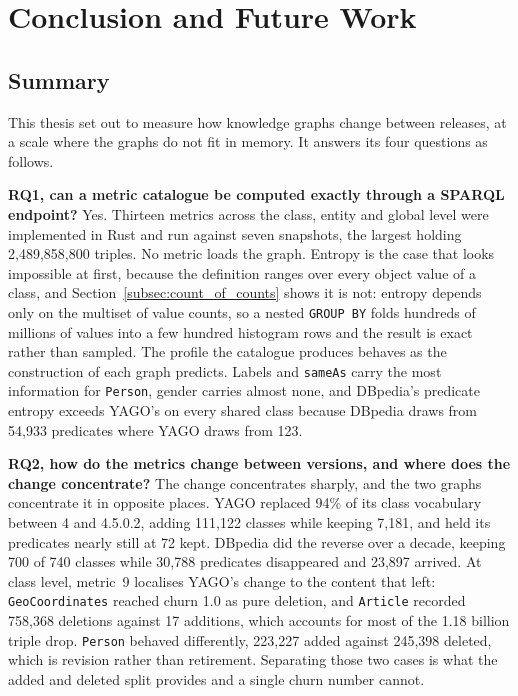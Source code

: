 \chapter{Conclusion and Future Work}
\label{chap:conclusion}

\section{Summary}
\label{sec:summary}

This thesis set out to measure how knowledge graphs change between releases, at
a scale where the graphs do not fit in memory. It answers its four questions as
follows.

\textbf{RQ1, can a metric catalogue be computed exactly through a SPARQL
endpoint?} Yes. Thirteen metrics across the class, entity and global level were
implemented in Rust and run against seven snapshots, the largest holding
2{,}489{,}858{,}800 triples. No metric loads the graph. Entropy is the case that
looks impossible at first, because the definition ranges over every object value
of a class, and Section~\ref{subsec:count_of_counts} shows it is not: entropy
depends only on the multiset of value counts, so a nested \texttt{GROUP BY}
folds hundreds of millions of values into a few hundred histogram rows and the
result is exact rather than sampled. The profile the catalogue produces behaves
as the construction of each graph predicts. Labels and \texttt{sameAs} carry the
most information for \texttt{Person}, gender carries almost none, and DBpedia's
predicate entropy exceeds YAGO's on every shared class because DBpedia draws
from 54{,}933 predicates where YAGO draws from 123.

\textbf{RQ2, how do the metrics change between versions, and where does the
change concentrate?} The change concentrates sharply, and the two graphs
concentrate it in opposite places. YAGO replaced 94\% of its class vocabulary
between 4 and 4.5.0.2, adding 111{,}122 classes while keeping 7{,}181, and held
its predicates nearly still at 72 kept. DBpedia did the reverse over a decade,
keeping 700 of 740 classes while 30{,}788 predicates disappeared and 23{,}897
arrived. At class level, metric~9 localises YAGO's change to the content that
left: \texttt{GeoCoordinates} reached churn 1.0 as pure deletion, and
\texttt{Article} recorded 758{,}368 deletions against 17 additions, which
accounts for most of the 1.18 billion triple drop. \texttt{Person} behaved
differently, 223{,}227 added against 245{,}398 deleted, which is revision rather
than retirement. Separating those two cases is what the added and deleted split
provides and a single churn number cannot.

